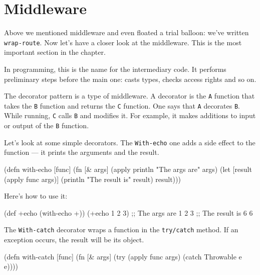 \section{Middleware}


Above we mentioned middleware and even floated a trial balloon: we've written \verb|wrap-route|. Now let's have a closer look at the middleware. This is the most important section in the chapter.

In programming, this is the name for the intermediary code. It performs preliminary steps before the main one: casts types, checks access rights and so on.

\label{decorator}


The decorator pattern is a type of middleware. A decorator is the \verb|A| function that takes the \verb|B| function and returns the \verb|C| function. One says that \verb|A| decorates \verb|B|. While running, \verb|C| calls \verb|B| and modifies it. For example, it makes additions to input or output of the \verb|B| function.

Let's look at some simple decorators. The \verb|With-echo| one adds a side effect to the function — it prints the arguments and the result.

\begin{clojure}
(defn with-echo [func]
  (fn [& args]
    (apply println "The args are" args)
    (let [result (apply func args)]
      (println "The result is" result)
      result)))
\end{clojure}

Here's how to use it:

\begin{clojure}
(def +echo (with-echo +))
(+echo 1 2 3)
;; The args are 1 2 3
;; The result is 6
6
\end{clojure}


The \verb|With-catch| decorator wraps a function in the \verb|try/catch| method. If an exception occurs, the result will be its object.

\begin{clojure}
(defn with-catch [func]
  (fn [& args]
    (try
      (apply func args)
      (catch Throwable e
        e))))
\end{clojure}


